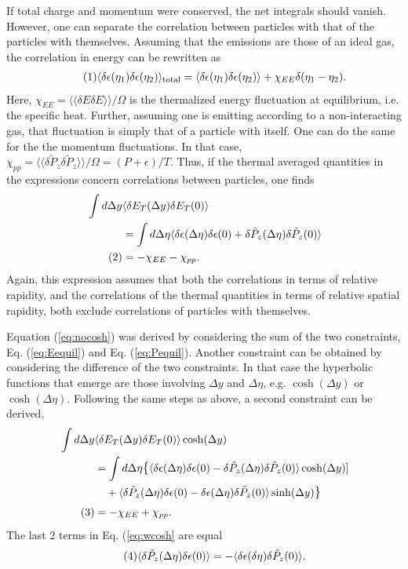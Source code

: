 \documentclass[12pt]{article}
\numberwithin{equation}{section}
\numberwithin{figure}{section}
\newcommand\eqnumber{\addtocounter{equation}{1}\tag{\theequation}}
\begin{document}
If total charge and momentum were conserved, the net integrals should vanish. However, one can separate the correlation between particles with that of the particles with themselves. Assuming that the emissions are those of an ideal gas, the correlation in energy can be rewritten as
\begin{align*}\eqnumber
\langle \delta\epsilon(\eta_1)\delta\epsilon(\eta_2)\rangle_{\rm total}
=\langle \delta\epsilon(\eta_1)\delta\epsilon(\eta_2)\rangle+\chi_{EE}\delta(\eta_1-\eta_2).
\end{align*}
Here, $\chi_{EE}=\langle\langle \delta E\delta E\rangle\rangle/\Omega$ is the thermalized energy fluctuation at equilibrium, i.e. the specific heat. Further, assuming one is emitting according to a non-interacting gas, that fluctuation is simply that of a particle with itself. One can do the same for the the momentum fluctuations. In that case, $\chi_{pp}=\langle\langle \delta \tilde{P}_z\delta \tilde{P}_z\rangle\rangle/\Omega=(P+\epsilon)/T$. Thus, if the thermal averaged quantities in the expressions concern correlations between particles, one finds
\begin{align*}
\int d\Delta y&\langle \delta E_T(\Delta y)\delta E_T(0)\rangle\\
&=\int d\Delta\eta\langle \delta\epsilon(\Delta\eta)\delta\epsilon(0)+\delta\tilde{P}_z(\Delta\eta)\delta\tilde{P}_z(0)\rangle\\
\eqnumber\label{eq:nocosh}
&=-\chi_{EE}-\chi_{pp}.
\end{align*}
Again, this expression assumes that both the correlations in terms of relative rapidity, and the correlations of the thermal quantities in terms of relative spatial rapidity, both exclude correlations of particles with themselves.

Equation (\ref{eq:nocosh}) was derived by considering the sum of the two constraints, Eq. (\ref{eq:Eequil}) and Eq. (\ref{eq:Pequil}). Another constraint can be obtained by considering the difference of the two constraints. In that case the hyperbolic functions that emerge are those involving $\Delta y$ and $\Delta\eta$, e.g. $\cosh(\Delta y)$ or $\cosh(\Delta\eta)$. Following the same steps as above, a second constraint can be derived,
\begin{align*}
\int d\Delta y &\langle \delta E_T(\Delta y)\delta E_T(0)\rangle\cosh(\Delta y)\\
&=\int d\Delta\eta\mathlarger{\{}\langle \delta\epsilon(\Delta\eta)\delta\epsilon(0)-\delta\tilde{P}_z(\Delta\eta)\delta\tilde{P}_z(0)\rangle\cosh(\Delta y)]\\
&~~~+\langle \delta\tilde{P}_z(\Delta\eta)\delta\epsilon(0)-\delta\epsilon(\Delta\eta)\delta\tilde{P}_z(0)\rangle\sinh(\Delta y)\mathlarger{\}}\\
\eqnumber\label{eq:wcosh}
&=-\chi_{EE}+\chi_{pp}.
\end{align*}
The last 2 terms in Eq. (\ref{eq:wcosh} are equal
\begin{align*}\eqnumber
\langle\delta\tilde{P}_z(\Delta\eta)\delta\epsilon(0)\rangle=
-\langle\delta\epsilon(\delta\eta)\delta\tilde{P}_z(0)\rangle.
\end{align*}
\end{document}
